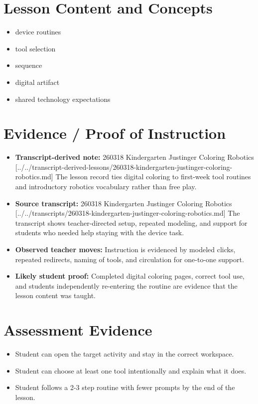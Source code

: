 \documentclass[11pt]{article}
\begin{document}
\section*{Lesson Content and Concepts}
\begin{itemize}[leftmargin=*]
\item device routines
\item tool selection
\item sequence
\item digital artifact
\item shared technology expectations
\end{itemize}

\section*{Evidence / Proof of Instruction}
\begin{itemize}[leftmargin=*]
\item \textbf{Transcript-derived note:} 260318 Kindergarten Justinger Coloring Robotics [../../transcript-derived-lessons/260318-kindergarten-justinger-coloring-robotics.md] The lesson record ties digital coloring to first-week tool routines and introductory robotics vocabulary rather than free play.
\item \textbf{Source transcript:} 260318 Kindergarten Justinger Coloring Robotics [../../transcripts/260318-kindergarten-justinger-coloring-robotics.md] The transcript shows teacher-directed setup, repeated modeling, and support for students who needed help staying with the device task.
\item \textbf{Observed teacher moves:} Instruction is evidenced by modeled clicks, repeated redirects, naming of tools, and circulation for one-to-one support.
\item \textbf{Likely student proof:} Completed digital coloring pages, correct tool use, and students independently re-entering the routine are evidence that the lesson content was taught.
\end{itemize}

\section*{Assessment Evidence}
\begin{itemize}[leftmargin=*]
\item Student can open the target activity and stay in the correct workspace.
\item Student can choose at least one tool intentionally and explain what it does.
\item Student follows a 2-3 step routine with fewer prompts by the end of the lesson.
\end{itemize}
\end{document}
